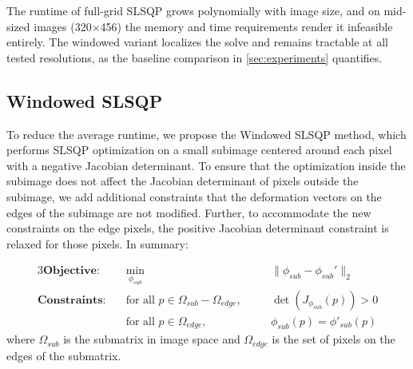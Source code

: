 The runtime of full-grid SLSQP grows polynomially with image size, and on mid-sized images (320$\times$456) the memory and time requirements render it infeasible entirely. The windowed variant localizes the solve and remains tractable at all tested resolutions, as the baseline comparison in \autoref{sec:experiments} quantifies.

\subsection{Windowed SLSQP}
\label{sec:windowed_slsqp}

To reduce the average runtime, we propose the Windowed SLSQP method, which performs SLSQP optimization on a small subimage centered around each pixel with a negative Jacobian determinant. To ensure that the optimization inside the subimage does not affect the Jacobian determinant of pixels outside the subimage, we add additional constraints that the deformation vectors on the edges of the subimage are not modified. Further, to accommodate the new constraints on the edge pixels, the positive Jacobian determinant constraint is relaxed for those pixels. In summary:

\begin{alignat}{3}
\textbf{Objective:} \quad & \min_{\phi_{sub}} && \quad \|\phi_{sub} - \phi_{sub}'\|_2 \label{eq:iter_objective_function} \\
\textbf{Constraints:} \quad & \text{for all } p \in \Omega_{sub}-\Omega_{edge}, && \quad \det(J_{\phi_{sub}}(p)) > 0 \\
\quad & \text{for all } p \in \Omega_{edge}, && \quad \phi_{sub}(p) = \phi'_{sub}(p)
\label{eq:iter_opt_constraint}
\end{alignat}
where $\Omega_{sub}$ is the submatrix in image space and $\Omega_{edge}$ is the set of pixels on the edges of the submatrix.

